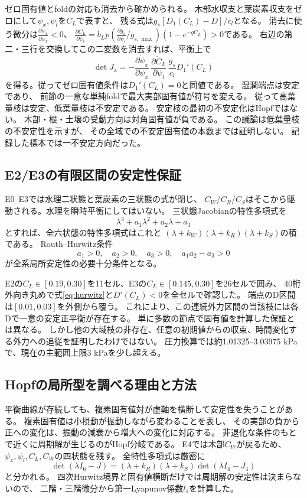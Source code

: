 \documentclass[a4paper,11pt]{ltjsarticle}
\begin{document}
ゼロ固有値とfoldの対応も消去から確かめられる。
木部水収支と葉炭素収支をゼロにして$\psi_x,\psi_l$を$C_L$で表すと、
残る式は$g_s[D_1(C_L)-D]/c_l$となる。
消去に使う微分は$\frac{\partial\dot \psi_x}{\partial \psi_x}<0$、
$\frac{\partial\dot C_L}{\partial \psi_l}=b_Lp(\frac{\partial g_s}{\partial\psi_l}/g_{s,\max})(1-e^{-qC_L})>0$である。
右辺の第二・三行を交換してこの二変数を消去すれば、平衡上で
\begin{equation}
 \det J_{\mathrm a}
 =-\frac{\partial\dot \psi_x}{\partial \psi_x}\,\frac{\partial\dot C_L}{\partial \psi_l}\,
       \frac{g_s}{c_l}D_1'(C_L)
\end{equation}
を得る。従ってゼロ固有値条件は$D_1'(C_L)=0$と同値である。
湿潤端点は安定であり、
前節の一意な単純foldで最大実部固有値が符号を変える。
従って高葉量枝は安定、低葉量枝は不安定である。
安定枝の最初の不安定化はHopfではない。
木部・根・土壌の受動方向は対角固有値が負である。
この議論は低葉量枝の不安定性を示すが、
その全域での不安定固有値の本数までは証明しない。
記録した標本では一不安定方向だった。

\subsection{E2/E3の有限区間の安定性保証}
E0--E3では水理二状態と葉炭素の三状態の式が閉じ、
$C_W$/$C_R$/$C_S$はそこから駆動される。水理を瞬時平衡にしてはいない。
三状態Jacobianの特性多項式を
\begin{equation}
 \lambda^3+a_1\lambda^2+a_2\lambda+a_3
\end{equation}
とすれば、全六状態の特性多項式はこれと
$(\lambda+k_W)(\lambda+k_R)(\lambda+k_S)$の積である。
Routh--Hurwitz条件
\begin{equation}\label{eq:hurwitz}
 a_1>0,\quad a_2>0,\quad a_3>0,\quad a_1a_2-a_3>0
\end{equation}
が全系局所安定性の必要十分条件となる。

E2の$C_L\in[0.19,0.30]$を11セル、E3の$C_L\in[0.145,0.30]$を26セルで囲み、
40桁外向き丸めで式\eqref{eq:hurwitz}と$D'(C_L)<0$を全セルで確認した。
端点のD区間は$[0.01,0.03]$を外側から覆う。
これにより、この連続外力区間の当該枝には各Dで一意の安定正平衡が存在する。
単に多数の節点で固有値を計算した保証とは異なる。
しかし他の大域枝の非存在、任意の初期値からの収束、時間変化する外力への追従を証明したわけではない。
圧力換算では約1.01325--3.03975 kPaで、現在の主範囲上限3 kPaを少し超える。

\subsection{Hopfの局所型を調べる理由と方法}
平衡曲線が存続しても、複素固有値対が虚軸を横断して安定性を失うことがある。
複素固有値は小摂動が振動しながら変わることを表し、
その実部の負から正への変化は、振動の減衰から増大への変化に対応する。
非退化な条件のもとで近くに周期解が生じるのがHopf分岐である。
E4では木部$C_W$が戻るため、$\psi_x,\psi_l,C_L,C_W$の四状態を残す。
全特性多項式は厳密に
\begin{equation}
 \det(\lambda I_6-J)=(\lambda+k_R)(\lambda+k_S)\det(\lambda I_4-J_4)
\end{equation}
と分かれる。
四次Hurwitz境界と固有値横断だけでは周期解の安定性は決まらないので、
二階・三階微分から第一Lyapunov係数$l_1$を計算した。
\end{document}
